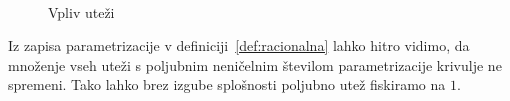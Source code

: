 \documentclass[isrm2, tisk]{fmfdelo}
\begin{document}
    \begin{figure}[h]
        \centering
        \qquad
        \\
        \qquad
        \caption{Vpliv uteži}
        \label{fig:uteži}
    \end{figure}
    Iz zapisa parametrizacije v definiciji~\ref{def:racionalna} lahko hitro vidimo, da množenje vseh uteži s poljubnim neničelnim številom parametrizacije krivulje ne spremeni.
    Tako lahko brez izgube splošnosti poljubno utež fiskiramo na $1$.
\end{document}
